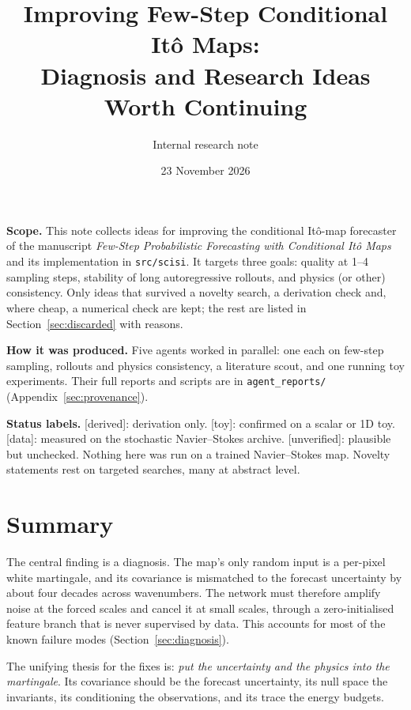 \documentclass[11pt,a4paper]{article}
\title{Improving Few-Step Conditional It\^o Maps:\\ Diagnosis and Research Ideas Worth Continuing}
\author{Internal research note}
\date{23 November 2026}
\newcommand{\status}[1]{\textsf{\small\color{black!60}[#1]}}
\begin{document}
\maketitle

\noindent\textbf{Scope.} This note collects ideas for improving the conditional It\^o-map forecaster of the manuscript \emph{Few-Step Probabilistic Forecasting with Conditional It\^o Maps} and its implementation in \texttt{src/scisi}. It targets three goals: quality at 1--4 sampling steps, stability of long autoregressive rollouts, and physics (or other) consistency. Only ideas that survived a novelty search, a derivation check and, where cheap, a numerical check are kept; the rest are listed in Section~\ref{sec:discarded} with reasons.

\medskip\noindent\textbf{How it was produced.} Five agents worked in parallel: one each on few-step sampling, rollouts and physics consistency, a literature scout, and one running toy experiments. Their full reports and scripts are in \texttt{agent\_reports/} (Appendix~\ref{sec:provenance}).

\medskip\noindent\textbf{Status labels.} \status{derived}: derivation only. \status{toy}: confirmed on a scalar or 1D toy. \status{data}: measured on the stochastic Navier--Stokes archive. \status{unverified}: plausible but unchecked. Nothing here was run on a trained Navier--Stokes map. Novelty statements rest on targeted searches, many at abstract level.

\section{Summary}

The central finding is a diagnosis. The map's only random input is a per-pixel white martingale, and its covariance is mismatched to the forecast uncertainty by about four decades across wavenumbers. The network must therefore amplify noise at the forced scales and cancel it at small scales, through a zero-initialised feature branch that is never supervised by data. This accounts for most of the known failure modes (Section~\ref{sec:diagnosis}).

The unifying thesis for the fixes is: \emph{put the uncertainty and the physics into the martingale}. Its covariance should be the forecast uncertainty, its null space the invariants, its conditioning the observations, and its trace the energy budgets.
\end{document}
